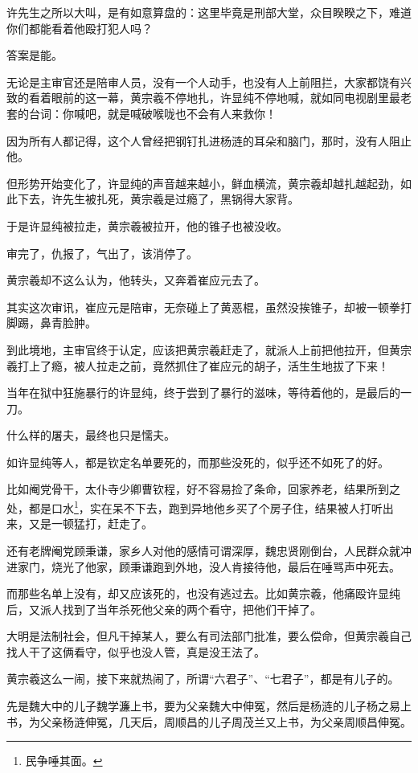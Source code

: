 \begin{multicols}{\theparacolNo}
许先生之所以大叫，是有如意算盘的：这里毕竟是刑部大堂，众目睽睽之下，难道你们都能看着他殴打犯人吗？

答案是能。

无论是主审官还是陪审人员，没有一个人动手，也没有人上前阻拦，大家都饶有兴致的看着眼前的这一幕，黄宗羲不停地扎，许显纯不停地喊，就如同电视剧里最老套的台词：你喊吧，就是喊破喉咙也不会有人来救你！

因为所有人都记得，这个人曾经把钢钉扎进杨涟的耳朵和脑门，那时，没有人阻止他。

但形势开始变化了，许显纯的声音越来越小，鲜血横流，黄宗羲却越扎越起劲，如此下去，许先生被扎死，黄宗羲是过瘾了，黑锅得大家背。

于是许显纯被拉走，黄宗羲被拉开，他的锥子也被没收。

审完了，仇报了，气出了，该消停了。

黄宗羲却不这么认为，他转头，又奔着崔应元去了。

其实这次审讯，崔应元是陪审，无奈碰上了黄恶棍，虽然没挨锥子，却被一顿拳打脚踢，鼻青脸肿。

到此境地，主审官终于认定，应该把黄宗羲赶走了，就派人上前把他拉开，但黄宗羲打上了瘾，被人拉走之前，竟然抓住了崔应元的胡子，活生生地拔了下来！

当年在狱中狂施暴行的许显纯，终于尝到了暴行的滋味，等待着他的，是最后的一刀。

什么样的屠夫，最终也只是懦夫。

如许显纯等人，都是钦定名单要死的，而那些没死的，似乎还不如死了的好。

比如阉党骨干，太仆寺少卿曹钦程，好不容易捡了条命，回家养老，结果所到之处，都是口水\footnote{民争唾其面。}，实在呆不下去，跑到异地他乡买了个房子住，结果被人打听出来，又是一顿猛打，赶走了。

还有老牌阉党顾秉谦，家乡人对他的感情可谓深厚，魏忠贤刚倒台，人民群众就冲进家门，烧光了他家，顾秉谦跑到外地，没人肯接待他，最后在唾骂声中死去。

而那些名单上没有，却又应该死的，也没有逃过去。比如黄宗羲，他痛殴许显纯后，又派人找到了当年杀死他父亲的两个看守，把他们干掉了。

大明是法制社会，但凡干掉某人，要么有司法部门批准，要么偿命，但黄宗羲自己找人干了这俩看守，似乎也没人管，真是没王法了。

黄宗羲这么一闹，接下来就热闹了，所谓“六君子”、“七君子”，都是有儿子的。

先是魏大中的儿子魏学濂上书，要为父亲魏大中伸冤，然后是杨涟的儿子杨之易上书，为父亲杨涟伸冤，几天后，周顺昌的儿子周茂兰又上书，为父亲周顺昌伸冤。


\end{multicols}
